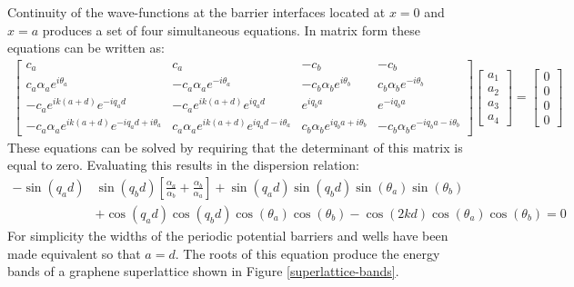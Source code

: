 			Continuity of the wave-functions at the barrier interfaces located at $x=0$ and $x=a$ produces a set of four simultaneous equations. In matrix form these equations can be written as:
			\begin{align}
				\left[\begin{array}{cccc}
					c_{a}&c_{a}&-c_{b}&-c_{b}\\
					c_{a}\alpha_{a}e^{i\theta_{a}}&-c_{a}\alpha_{a}e^{-i\theta_{a}}&-c_{b}\alpha_{b}e^{i\theta_{b}}&c_{b}\alpha_{b}e^{-i\theta_{b}}\\
					-c_{a}e^{ik\left(a+d\right)}e^{-iq_{a}d}&-c_{a}e^{ik\left(a+d\right)}e^{iq_{a}d}&e^{iq_{b}a}&e^{-iq_{b}a}\\
					-c_{a}\alpha_{a}e^{ik\left(a+d\right)}e^{-iq_{a}d+i\theta_{a}}&c_{a}\alpha_{a}e^{ik\left(a+d\right)}e^{iq_{a}d-i\theta_{a}}&c_{b}\alpha_{b} e^{iq_{b}a+i\theta_{b}}&-c_{b}\alpha_{b} e^{-iq_{b}a-i\theta_{b}}
				\end{array}\right]
				\left[\begin{array}{cccc}
					a_{1}\\
					a_{2}\\
					a_{3}\\
					a_{4}
				\end{array}\right]
				=
				\left[\begin{array}{cccc}
					0\\
					0\\
					0\\
					0
				\end{array}\right]
			\end{align}
			These equations can be solved by requiring that the determinant of this matrix is equal to zero. Evaluating this results in the dispersion relation:
			\begin{align}
				-\sin(q_{a}d)&\sin(q_{b}d)\left[\frac{\alpha_{a}}{\alpha_{b}}+\frac{\alpha_{b}}{\alpha_{a}}\right]+\sin(q_{a}d)\sin(q_{b}d)\sin(\theta_{a})\sin(\theta_{b})\\
				&+\cos(q_{a}d)\cos(q_{b}d)\cos(\theta_{a})\cos(\theta_{b})-\cos(2kd)\cos(\theta_{a})\cos(\theta_{b})=0
				\label{Rectangular Barrier band eq}
			\end{align}
			For simplicity the widths of the periodic potential barriers and wells have been made equivalent so that $a=d$. The roots of this equation produce the energy bands of a graphene superlattice shown in Figure \ref{superlattice-bands}.
